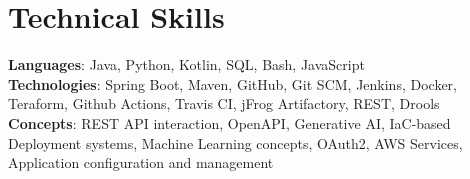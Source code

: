 \section{Technical Skills}
    \begin{itemize}[leftmargin=0.15in, label={}]
	\small{\item{
		\textbf{Languages}{: Java, Python, Kotlin, SQL, Bash, JavaScript} \\
		\textbf{Technologies}{: Spring Boot, Maven, GitHub, Git SCM, Jenkins, Docker, Teraform, Github Actions, Travis CI, jFrog Artifactory, REST, Drools} \\
		\textbf{Concepts}{: REST API interaction, OpenAPI, Generative AI, IaC-based Deployment systems, Machine Learning concepts, OAuth2, AWS Services, Application configuration and management}
	}}
    \end{itemize}